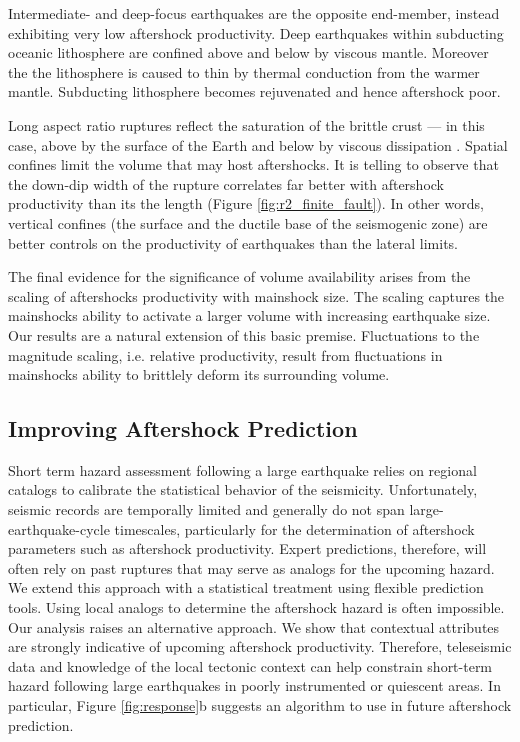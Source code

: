 \documentclass[draft]{agujournal2018}
\begin{document}
Intermediate- and deep-focus earthquakes are the opposite end-member, instead exhibiting very low aftershock productivity. Deep earthquakes within subducting oceanic lithosphere are confined above and below by viscous mantle. Moreover the the lithosphere is caused to thin by thermal conduction from the warmer mantle. Subducting lithosphere becomes rejuvenated and hence aftershock poor.

Long aspect ratio ruptures reflect the saturation of the brittle crust --- in this case, above by the surface of the Earth and below by viscous dissipation \citep{Scholz2019}. Spatial confines limit the volume that may host aftershocks. It is telling to observe that the down-dip width of the rupture correlates far better with aftershock productivity than its the length (Figure \ref{fig:r2_finite_fault}). In other words, vertical confines (the surface and the ductile base of the seismogenic zone) are better controls on the productivity of earthquakes than the lateral limits. 

The final evidence for the significance of volume availability arises from the scaling of aftershocks productivity with mainshock size. The scaling captures the mainshocks ability to activate a larger volume with increasing earthquake size. Our results are a natural extension of this basic premise. Fluctuations to the magnitude scaling, i.e. relative productivity, result from fluctuations in mainshocks ability to brittlely deform its surrounding volume. 
    
\subsection{Improving Aftershock Prediction}
 
Short term hazard assessment following a large earthquake relies on regional catalogs to calibrate the statistical behavior of the seismicity. Unfortunately, seismic records are temporally limited and generally do not span large-earthquake-cycle timescales, particularly for the determination of aftershock parameters such as aftershock productivity. Expert predictions, therefore, will often rely on past ruptures that may serve as analogs for the upcoming hazard. We extend this approach with a statistical treatment using flexible prediction tools. Using local analogs to determine the aftershock hazard is often impossible. Our analysis raises an alternative approach. We show that contextual attributes are strongly indicative of upcoming aftershock productivity. Therefore, teleseismic data and knowledge of the local tectonic context can help constrain short-term hazard following large earthquakes in poorly instrumented or quiescent areas. In particular, Figure \ref{fig:response}b suggests an algorithm to use in future aftershock prediction.
\end{document}
